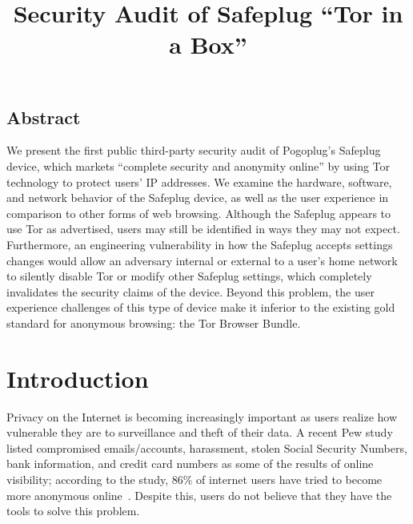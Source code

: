 \documentclass[letterpaper,twocolumn,10pt]{article}
\begin{document}
\date{}

\title{\Large \bf Security Audit of Safeplug ``Tor in a Box''}

\maketitle


\subsection*{Abstract}
We present the first public third-party security audit of Pogoplug's Safeplug device, which markets ``complete security and anonymity online'' by using Tor technology to protect users' IP addresses.  We examine the hardware, software, and network behavior of the Safeplug device, as well as the user experience in comparison to other forms of web browsing.  Although the Safeplug appears to use Tor as advertised, users may still be identified in ways they may not expect.  Furthermore, an engineering vulnerability in how the Safeplug accepts settings changes would allow an adversary internal or external to a user's home network to silently disable Tor or modify other Safeplug settings, which completely invalidates the security claims of the device.  Beyond this problem, the user experience challenges of this type of device make it inferior to the existing gold standard for anonymous browsing: the Tor Browser Bundle.


\section{Introduction}
Privacy on the Internet is becoming increasingly important as users realize how vulnerable they are to surveillance and theft of their data.  A recent Pew study listed compromised emails/accounts, harassment, stolen Social Security Numbers, bank information, and credit card numbers as some of the results of online visibility; according to the study, 86\% of internet users have tried to become more anonymous online~\cite{pew}.  Despite this, users do not believe that they have the tools to solve this problem.
\end{document}
